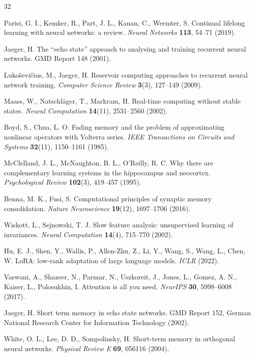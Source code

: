 \documentclass[preprint,12pt]{elsarticle}
\begin{document}
\begingroup{}
\begin{thebibliography}{32}

 Parisi, G. I., Kemker, R., Part, J. L., Kanan, C.,
Wermter, S. Continual lifelong learning with neural networks: a review.
\emph{Neural Networks} \textbf{113}, 54--71 (2019).

 Jaeger, H. The ``echo state'' approach to analysing
and training recurrent neural networks. GMD Report 148 (2001).

 Lukoševičius, M., Jaeger, H. Reservoir computing
approaches to recurrent neural network training. \emph{Computer Science
Review} \textbf{3}(3), 127--149 (2009).

 Maass, W., Natschläger, T., Markram, H. Real-time
computing without stable states. \emph{Neural Computation} \textbf{14}(11),
2531--2560 (2002).

 Boyd, S., Chua, L. O. Fading memory and the problem of
approximating nonlinear operators with Volterra series. \emph{IEEE
Transactions on Circuits and Systems} \textbf{32}(11), 1150--1161 (1985).

 McClelland, J. L., McNaughton, B. L., O'Reilly,
R. C. Why there are complementary learning systems in the hippocampus and
neocortex. \emph{Psychological Review} \textbf{102}(3), 419--457 (1995).

 Benna, M. K., Fusi, S. Computational principles of
synaptic memory consolidation. \emph{Nature Neuroscience} \textbf{19}(12),
1697--1706 (2016).

 Wiskott, L., Sejnowski, T. J. Slow feature analysis:
unsupervised learning of invariances. \emph{Neural Computation}
\textbf{14}(4), 715--770 (2002).

 Hu, E. J., Shen, Y., Wallis, P., Allen-Zhu, Z.,
Li, Y., Wang, S., Wang, L., Chen, W. LoRA: low-rank adaptation of large
language models. \emph{ICLR} (2022).

 Vaswani, A., Shazeer, N., Parmar, N., Uszkoreit,
J., Jones, L., Gomez, A. N., Kaiser, L., Polosukhin, I. Attention is all
you need. \emph{NeurIPS} \textbf{30}, 5998--6008 (2017).

 Jaeger, H. Short term memory in echo state
networks. GMD Report 152, German National Research Center for
Information Technology (2002).

 White, O. L., Lee, D. D., Sompolinsky, H.
Short-term memory in orthogonal neural networks. \emph{Physical Review
E} \textbf{69}, 056116 (2004).


\end{thebibliography}
\end{document}
